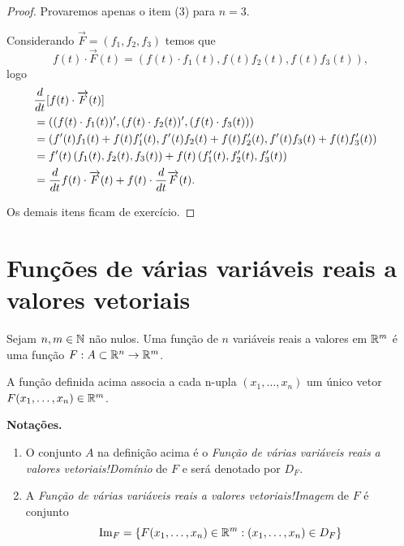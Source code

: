\begin{proof}
    Provaremos apenas o item (3) para \(n=3\).

    Considerando \(\overrightarrow{F} = (f_1,f_2,f_3)\) temos que \[f(t)\cdot\overrightarrow{F}(t) = (f(t)\cdot f_1(t), f(t) f_2(t), f(t)f_3(t)),\] logo
        \begin{align*}
            {\lefteqn{\frac{d}{dt}[f(t)\cdot\overrightarrow{F}(t)]}}\\
                & = \left( (f(t)\cdot f_1(t))', (f(t)\cdot f_2(t))', (f(t)\cdot f_3(t)) \right) \\
                & = \left( f'(t) f_1(t) + f(t) f_1'(t), f'(t) f_2(t) + f(t) f_2'(t), f'(t) f_3(t) + f(t) f_3'(t) \right) \\
                & = f'(t) \left( f_1(t), f_2(t), f_3(t) \right) + f(t) \left( f_1'(t), f_2'(t), f_3'(t) \right) \\
                & = \frac{d}{dt}f(t)\cdot\overrightarrow{F}(t) + f(t)\cdot\frac{d}{dt}\overrightarrow{F}(t).
        \end{align*}

    Os demais itens ficam de exercício.
\end{proof}

\chapter{Funções de várias variáveis reais a valores vetoriais}

\begin{definition}
    Sejam \(n,m\in\mathbb{N}\) não nulos. Uma função de \(n\) variáveis reais a valores em \(\mathbb{R}^m\) é uma função \(F: A \subset \mathbb{R}^n \to \mathbb{R}^m\).
\end{definition}

A função definida acima associa a cada n-upla \((x_1,\dots,x_n)\) um único vetor \(F(x_1,\dots,x_n)\in\mathbb{R}^m\). %

\textbf{Notações. }
    \begin{enumerate}
        \item O conjunto \(A\) na definição acima é o \textit{Função de várias variáveis reais a valores vetoriais!Domínio} de \(F\) e será denotado por \(D_F\).
        \item A \textit{Função de várias variáveis reais a valores vetoriais!Imagem} de \(F\) é conjunto \[\operatorname{Im}_F = \{F(x_1,\dots,x_n)\in\mathbb{R}^m : (x_1,\dots,x_n)\in D_F\}\]
    \end{enumerate}

